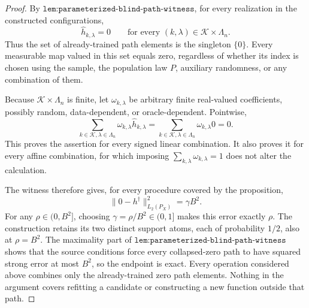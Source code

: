 \begin{proof}
By \(\texttt{lem:parameterized-blind-path-witness}\), for every realization in the constructed configurations,
\[
 \widehat h_{k,\lambda}=0
 \qquad\text{for every }(k,\lambda)\in\mathcal K\times\Lambda_n.
\]
Thus the set of already-trained path elements is the singleton \(\{0\}\). Every measurable map valued in this set equals zero, regardless of whether its index is chosen using the sample, the population law \(P\), auxiliary randomness, or any combination of them.

Because \(\mathcal K\times\Lambda_n\) is finite, let \(\omega_{k,\lambda}\) be arbitrary finite real-valued coefficients, possibly random, data-dependent, or oracle-dependent. Pointwise,
\[
 \sum_{k\in\mathcal K,\lambda\in\Lambda_n}
 \omega_{k,\lambda}\widehat h_{k,\lambda}
 =\sum_{k\in\mathcal K,\lambda\in\Lambda_n}
 \omega_{k,\lambda}0
 =0.
\]
This proves the assertion for every signed linear combination. It also proves it for every affine combination, for which imposing \(\sum_{k,\lambda}\omega_{k,\lambda}=1\) does not alter the calculation.

The witness therefore gives, for every procedure covered by the proposition,
\[
 \|0-h^\dagger\|_{L_2(P_X)}^2=\gamma B^2.
\]
For any \(\rho\in(0,B^2]\), choosing \(\gamma=\rho/B^2\in(0,1]\) makes this error exactly \(\rho\). The construction retains its two distinct support atoms, each of probability \(1/2\), also at \(\rho=B^2\). The maximality part of \(\texttt{lem:parameterized-blind-path-witness}\) shows that the source conditions force every collapsed-zero path to have squared strong error at most \(B^2\), so the endpoint is exact. Every operation considered above combines only the already-trained zero path elements. Nothing in the argument covers refitting a candidate or constructing a new function outside that path.
\end{proof}